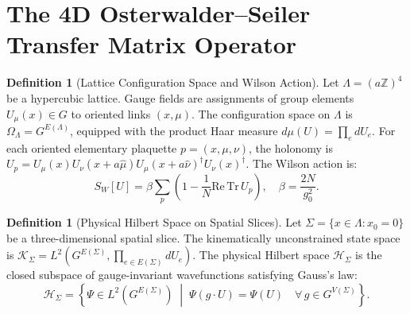 \documentclass[11pt,reqno]{amsart}
\theoremstyle{plain}
\theoremstyle{definition}
\newtheorem{definition}[theorem]{Definition}
\theoremstyle{remark}
\numberwithin{equation}{section}
\newcommand{\Tr}{\mathrm{Tr}}
\newcommand{\RePart}{\mathrm{Re}}
\begin{document}
\section{The 4D Osterwalder--Seiler Transfer Matrix Operator}
\label{sec:transfer}

\begin{definition}[Lattice Configuration Space and Wilson Action]
Let $\Lambda = (a \mathbb{Z})^4$ be a hypercubic lattice. Gauge fields are assignments of group elements $U_\mu(x) \in G$ to oriented links $(x, \mu)$. The configuration space on $\Lambda$ is $\Omega_\Lambda = G^{E(\Lambda)}$, equipped with the product Haar measure $d\mu(U) = \prod_{e} dU_e$. For each oriented elementary plaquette $p = (x, \mu, \nu)$, the holonomy is $U_p = U_\mu(x) U_\nu(x+a\hat{\mu}) U_\mu(x+a\hat{\nu})^\dagger U_\nu(x)^\dagger$. The Wilson action is:
\begin{equation}
S_W[U] = \beta \sum_p \left( 1 - \frac{1}{N} \RePart \, \Tr \, U_p \right), \quad \beta = \frac{2N}{g_0^2}.
\end{equation}
\end{definition}

\begin{definition}[Physical Hilbert Space on Spatial Slices]
Let $\Sigma = \{x \in \Lambda : x_0 = 0\}$ be a three-dimensional spatial slice. The kinematically unconstrained state space is $\mathcal{K}_\Sigma = L^2(G^{E(\Sigma)}, \prod_{e \in E(\Sigma)} dU_e)$. The physical Hilbert space $\mathcal{H}_\Sigma$ is the closed subspace of gauge-invariant wavefunctions satisfying Gauss's law:
\begin{equation}
\mathcal{H}_\Sigma = \left\{ \Psi \in L^2(G^{E(\Sigma)}) \;\middle|\; \Psi(g \cdot U) = \Psi(U) \quad \forall \, g \in G^{V(\Sigma)} \right\}.
\end{equation}
\end{definition}
\end{document}
